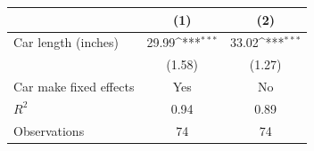 {
\def\sym#1{\ifmmode^{#1}\else\(^{#1}\)\fi}
\begin{tabular}{l*{2}{c}}
\hline\hline
            &\multicolumn{1}{c}{(1)}         &\multicolumn{1}{c}{(2)}         \\
\hline
Car length (inches)&       29.99\sym{***}&       33.02\sym{***}\\
            &      (1.58)         &      (1.27)         \\
\hline
Car make fixed effects&         Yes         &          No         \\
$R^{2}$     &        0.94         &        0.89         \\
Observations&          74         &          74         \\
\hline\hline
\end{tabular}
}

